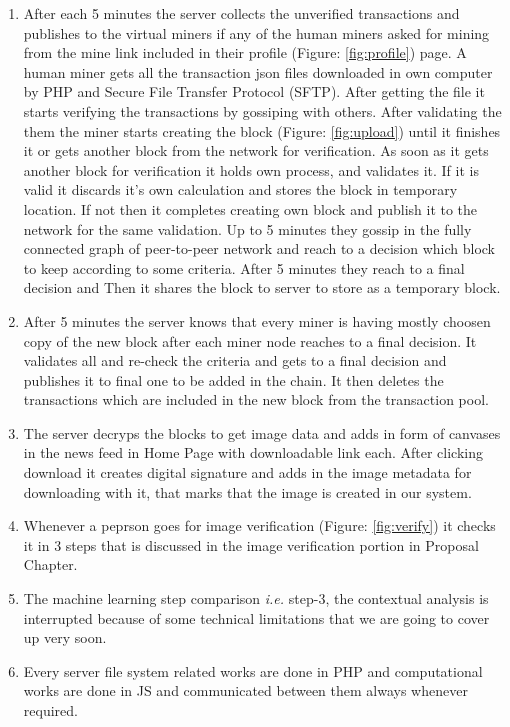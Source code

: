 \begin{enumerate}
\item After each 5 minutes the server collects the unverified transactions and publishes to the virtual miners if any of the human miners asked for mining from the mine link included in their profile (Figure: \ref{fig:profile}) page. A human miner gets all the transaction json files downloaded in own computer by PHP and Secure File Transfer Protocol (SFTP). After getting the file it starts verifying the transactions by gossiping with others. After validating the them the miner starts creating the block (Figure: \ref{fig:upload}) until it finishes it or gets another block from the network for verification. As soon as it gets another block for verification it holds own process, and validates it. If it is valid it discards it's own calculation and stores the block in temporary location. If not then it completes creating own block and publish it to the network for the same validation. Up to 5 minutes they gossip in the fully connected graph of peer-to-peer network and reach to a decision which block to keep according to some criteria. After 5 minutes they reach to a final decision and Then it shares the block to server to store as a temporary block.
\item After 5 minutes the server knows that every miner is having mostly choosen copy of the new block after each miner node reaches to a final decision. It validates all and re-check the criteria and gets to a final decision and publishes it to final one to be added in the chain. It then deletes the transactions which are included in the new block from the transaction pool.
\item The server decryps the blocks to get image data and adds in form of canvases in the news feed in Home Page with downloadable link each. After clicking download it creates digital signature and adds in the image metadata for downloading with it, that marks that the image is created in our system.
\item Whenever a peprson goes for image verification (Figure: \ref{fig:verify}) it checks it in 3 steps that is discussed in the image verification portion in Proposal Chapter.
\item The machine learning step comparison \textit{i.e.} step-3, the contextual analysis is interrupted because of some technical limitations that we are going to cover up very soon.
\item Every server file system related works are done in PHP and computational works are done in JS and communicated between them always whenever required.
\end{enumerate}

